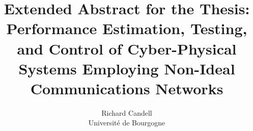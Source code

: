 \documentclass{article}
\begin{document}
	\title{Extended Abstract for the Thesis:\\Performance Estimation, Testing, and Control of Cyber-Physical Systems Employing Non-Ideal Communications Networks}
	\author{Richard Candell\\Universit\'e de Bourgogne}

	\maketitle            
\end{document}
